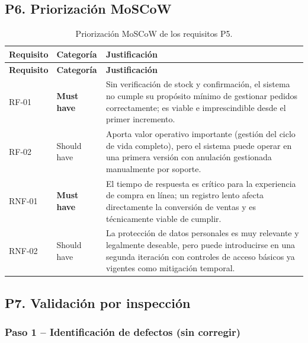 \documentclass[11pt]{article}
\begin{document}
\newpage
\subsection*{P6. Priorización MoSCoW }

\begin{longtable}{p{1.8cm}p{2.2cm}p{10cm}}
\caption{Priorización MoSCoW de los requisitos P5.}\\
\toprule
\textbf{Requisito} & \textbf{Categoría} & \textbf{Justificación} \\
\midrule
\endfirsthead
\toprule
\textbf{Requisito} & \textbf{Categoría} & \textbf{Justificación} \\
\midrule
\endhead
RF-01 & \textbf{Must have} & Sin verificación de stock y confirmación, el sistema no cumple su propósito
mínimo de gestionar pedidos correctamente; es viable e imprescindible desde el primer incremento. \\
RF-02 & Should have & Aporta valor operativo importante (gestión del ciclo de vida completo), pero el
sistema puede operar en una primera versión con anulación gestionada manualmente por soporte. \\
RNF-01 & \textbf{Must have} & El tiempo de respuesta es crítico para la experiencia de compra en línea;
un registro lento afecta directamente la conversión de ventas y es técnicamente viable de cumplir. \\
RNF-02 & Should have & La protección de datos personales es muy relevante y legalmente deseable, pero
puede introducirse en una segunda iteración con controles de acceso básicos ya vigentes como mitigación
temporal. \\
\bottomrule
\end{longtable}

\subsection*{P7. Validación por inspección}

\subsubsection*{Paso 1 -- Identificación de defectos (sin corregir)}
\end{document}
